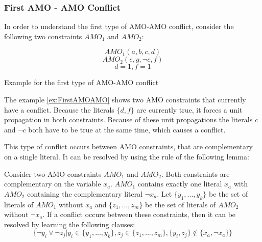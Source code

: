 \subsubsection{First AMO - AMO Conflict}

In order to understand the first type of AMO-AMO conflict, consider the following two constraints $AMO_1$ and $AMO_2$:

\begin{example}
\begin{leftbar}
\begin{displaymath}
AMO_1(a,b,c,d)
\end{displaymath}
\begin{displaymath}
AMO_2(e,g,\neg c,f)
\end{displaymath}
\begin{displaymath}
d = 1, f = 1
\end{displaymath}
\end{leftbar}
\caption{Example for the first type of AMO-AMO conflict}
\label{ex:FirstAMOAMO}
\end{example}

The example \ref{ex:FirstAMOAMO} shows two AMO constraints that currently have a conflict. Because the literals $\{d,f\}$ are currently true, it forces a unit propagation in both constraints. Because of these unit propagations the literals $c$ and $\neg c$ both have to be true at the same time, which causes a conflict.

This type of conflict occurs between AMO constraints, that are complementary on a single literal. It can be resolved by using the rule of the following lemma:

\begin{lemma}
\begin{leftbar}
Consider two AMO constraints $AMO_1$ and $AMO_2$. Both constraints are complementary on the variable $x_a$. $AMO_1$ contains exactly one literal $x_a$ with $AMO_2$ containing the complementary literal $\neg x_a$. Let $\{y_1,...,y_k\}$ be the set of literals of $AMO_1$ without $x_a$ and $\{z_1,...,z_m\}$ be the set of literals of $AMO_2$ without $\neg x_a$. 
If a conflict occurs between these constraints, then it can be resolved by learning the following clauses:
\begin{displaymath}
\{\neg y_i \vee \neg z_j | y_i \in \{y_1,...,y_k\}, z_j \in \{z_1,...,z_m\}, \{y_i,z_j\} \not\in \{x_a, \neg x_a\}\}
\end{displaymath}
\end{leftbar}
\label{le:oneComplementary}
\end{lemma}

